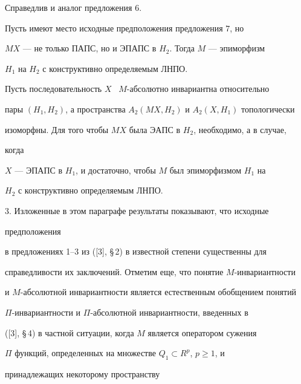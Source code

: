 Справедлив и аналог предложения 6.








\begin{prop}


Пусть имеют место исходные предположения предложения $7$, но


$MX$ --- не только ПАПС, но и ЭПАПС в $H_2$. Тогда $M$ --- эпиморфизм


$H_1$ на $H_2$ с конструктивно определяемым ЛНПО.


\end{prop}








\begin{cornonum}


Пусть последовательность $X$ \ $M$-абсолютно инвариантна относительно


пары $(H_1,H_2)$, а пространства $A_2(MX,H_2)$ и $A_2(X,H_1)$ топологически


изоморфны. Для того чтобы $MX$ была ЭАПС в $H_2$, необходимо, а в случае,


когда


$X$ --- ЭПАПС в $H_1$, и достаточно, чтобы $M$ был эпиморфизмом $H_1$ на


$H_2$ с конструктивно определяемым ЛНПО.


\end{cornonum}








3. Изложенные в этом параграфе результаты показывают, что исходные


предположения


в предложениях 1--3 из ([3], \S\,2) в известной степени существенны для


справедливости их заключений. Отметим еще, что понятие $M$-инвариантности


и $M$-абсолютной инвариантности является естественным обобщением понятий


$\Pi$-инвариантности и $\Pi$-абсолютной инвариантности, введенных в


([3], \S\,4) в частной ситуации, когда $M$ является оператором сужения


$\Pi$ функций, определенных на множестве $Q_1\subset R^p$, $p\ge 1$, и


принадлежащих некоторому пространству


